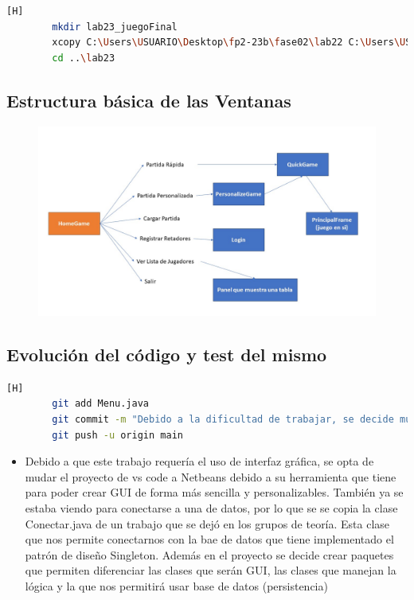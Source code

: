 \documentclass{article}
\begin{document}
	\begin{lstlisting}[language=bash,caption={Se crea un nuevo proecto en Netbeans }][H]
		mkdir lab23_juegoFinal
		xcopy C:\Users\USUARIO\Desktop\fp2-23b\fase02\lab22 C:\Users\USUARIO\Desktop\fp2-23b\fase02\lab23_juegoFinal /s /e
		cd ..\lab23
	\end{lstlisting}
	
	
	\subsection{Estructura básica de las Ventanas}
	
	\begin{figure}[H]
		\centering
		\includegraphics[width=1\textwidth,keepaspectratio]{img/estructura.jpg}
	\end{figure}
	
	
	

	
	\subsection{Evolución del código y test del mismo}
	
	
	\begin{lstlisting}[language=bash,caption={Commit: de0f855ead9602d62a573015aa8941d54e373d59 }][H]
		git add Menu.java
		git commit -m "Debido a la dificultad de trabajar, se decide mudar los archivos del proyecto a netbeans, hasta este cambio se creo un metodo dentro de conectar para crear un nuevo usuario"			
		git push -u origin main
	\end{lstlisting}
	
	\begin{itemize}	
	\item Debido a que este trabajo requería el uso  de interfaz gráfica, se opta de mudar el proyecto de vs code a Netbeans debido a su herramienta que tiene para poder crear GUI de forma más sencilla y personalizables. También ya se estaba viendo para conectarse a una de datos, por lo que se se copia la clase Conectar.java de un trabajo que se dejó en los grupos de teoría. Esta clase que nos permite conectarnos con la bae de datos que tiene implementado el patrón de diseño Singleton. Además en el proyecto se decide crear paquetes que permiten diferenciar las clases que serán GUI, las clases que manejan la lógica y la que nos permitirá usar base de datos (persistencia)
	\end{itemize}
	
\end{document}
